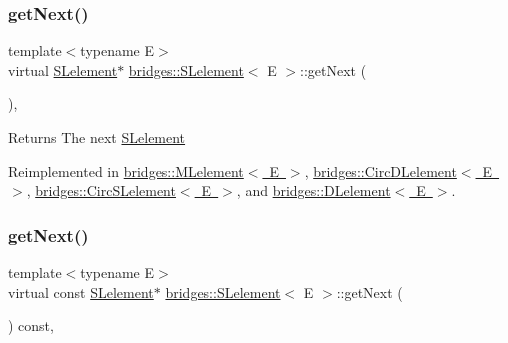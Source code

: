 \subsubsection{\texorpdfstring{get\+Next()}{getNext()}\hspace{0.1cm}{\footnotesize\ttfamily [1/2]}}
{\footnotesize\ttfamily template$<$typename E$>$ \\
virtual \mbox{\hyperlink{classbridges_1_1_s_lelement}{S\+Lelement}}$\ast$ \mbox{\hyperlink{classbridges_1_1_s_lelement}{bridges\+::\+S\+Lelement}}$<$ E $>$\+::get\+Next (\begin{DoxyParamCaption}{ }\end{DoxyParamCaption})\hspace{0.3cm}{\ttfamily [inline]}, {\ttfamily [virtual]}}

\begin{DoxyReturn}{Returns}
The next \mbox{\hyperlink{classbridges_1_1_s_lelement}{S\+Lelement}} 
\end{DoxyReturn}


Reimplemented in \mbox{\hyperlink{classbridges_1_1_m_lelement_aceebd292e7d497f44eea5c4845e7709f}{bridges\+::\+M\+Lelement$<$ E $>$}}, \mbox{\hyperlink{classbridges_1_1_circ_d_lelement_a52996d42efc5680d1f8b406143abfee5}{bridges\+::\+Circ\+D\+Lelement$<$ E $>$}}, \mbox{\hyperlink{classbridges_1_1_circ_s_lelement_aab863627c125c6f1075af7e7b7f340cf}{bridges\+::\+Circ\+S\+Lelement$<$ E $>$}}, and \mbox{\hyperlink{classbridges_1_1_d_lelement_a0c713707d8c7d0a97fe4194ed6592ede}{bridges\+::\+D\+Lelement$<$ E $>$}}.

\mbox{\label{classbridges_1_1_s_lelement_a4422b7731a84734d312b8cd8e241b1e8}} 
\subsubsection{\texorpdfstring{get\+Next()}{getNext()}\hspace{0.1cm}{\footnotesize\ttfamily [2/2]}}
{\footnotesize\ttfamily template$<$typename E$>$ \\
virtual const \mbox{\hyperlink{classbridges_1_1_s_lelement}{S\+Lelement}}$\ast$ \mbox{\hyperlink{classbridges_1_1_s_lelement}{bridges\+::\+S\+Lelement}}$<$ E $>$\+::get\+Next (\begin{DoxyParamCaption}{ }\end{DoxyParamCaption}) const\hspace{0.3cm}{\ttfamily [inline]}, {\ttfamily [virtual]}}

